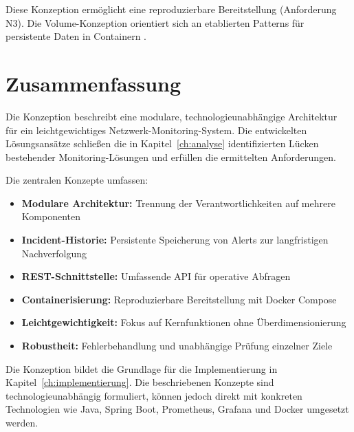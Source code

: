 Diese Konzeption ermöglicht eine reproduzierbare Bereitstellung (Anforderung N3). Die Volume-Konzeption orientiert sich an etablierten Patterns für persistente Daten in Containern \cite{docker-volume-patterns}.

\section{Zusammenfassung}
\label{sec:zusammenfassung-konzeption}

Die Konzeption beschreibt eine modulare, technologieunabhängige Architektur für ein leichtgewichtiges Netzwerk-Monitoring-System. Die entwickelten Lösungsansätze schließen die in Kapitel~\ref{ch:analyse} identifizierten Lücken bestehender Monitoring-Lösungen und erfüllen die ermittelten Anforderungen.

Die zentralen Konzepte umfassen:

\begin{itemize}
    \item \textbf{Modulare Architektur:} Trennung der Verantwortlichkeiten auf mehrere Komponenten
    \item \textbf{Incident-Historie:} Persistente Speicherung von Alerts zur langfristigen Nachverfolgung
    \item \textbf{REST-Schnittstelle:} Umfassende API für operative Abfragen
    \item \textbf{Containerisierung:} Reproduzierbare Bereitstellung mit Docker Compose
    \item \textbf{Leichtgewichtigkeit:} Fokus auf Kernfunktionen ohne Überdimensionierung
    \item \textbf{Robustheit:} Fehlerbehandlung und unabhängige Prüfung einzelner Ziele
\end{itemize}

Die Konzeption bildet die Grundlage für die Implementierung in Kapitel~\ref{ch:implementierung}. Die beschriebenen Konzepte sind technologieunabhängig formuliert, können jedoch direkt mit konkreten Technologien wie Java, Spring Boot, Prometheus, Grafana und Docker umgesetzt werden.